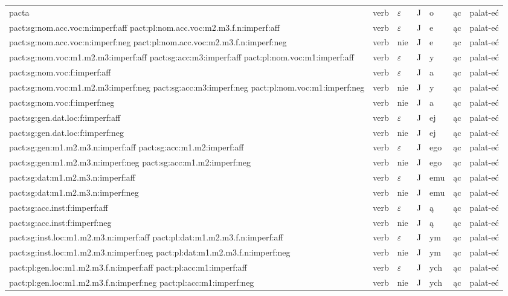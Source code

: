 \documentclass{article}
\begin{document}
\begin{longtable}{p{7cm}|l|l|l|l|l|l}
pacta & verb & $\varepsilon$ & J & o & ąc & palat-eć\\
pact:sg:nom.acc.voc:n:imperf:aff pact:pl:nom.acc.voc:m2.m3.f.n:imperf:aff & verb & $\varepsilon$ & J & e & ąc & palat-eć\\
pact:sg:nom.acc.voc:n:imperf:neg pact:pl:nom.acc.voc:m2.m3.f.n:imperf:neg & verb & nie & J & e & ąc & palat-eć\\
pact:sg:nom.voc:m1.m2.m3:imperf:aff pact:sg:acc:m3:imperf:aff pact:pl:nom.voc:m1:imperf:aff & verb & $\varepsilon$ & J & y & ąc & palat-eć\\
pact:sg:nom.voc:f:imperf:aff & verb & $\varepsilon$ & J & a & ąc & palat-eć\\
pact:sg:nom.voc:m1.m2.m3:imperf:neg pact:sg:acc:m3:imperf:neg pact:pl:nom.voc:m1:imperf:neg & verb & nie & J & y & ąc & palat-eć\\
pact:sg:nom.voc:f:imperf:neg & verb & nie & J & a & ąc & palat-eć\\
pact:sg:gen.dat.loc:f:imperf:aff & verb & $\varepsilon$ & J & ej & ąc & palat-eć\\
pact:sg:gen.dat.loc:f:imperf:neg & verb & nie & J & ej & ąc & palat-eć\\
pact:sg:gen:m1.m2.m3.n:imperf:aff pact:sg:acc:m1.m2:imperf:aff & verb & $\varepsilon$ & J & ego & ąc & palat-eć\\
pact:sg:gen:m1.m2.m3.n:imperf:neg pact:sg:acc:m1.m2:imperf:neg & verb & nie & J & ego & ąc & palat-eć\\
pact:sg:dat:m1.m2.m3.n:imperf:aff & verb & $\varepsilon$ & J & emu & ąc & palat-eć\\
pact:sg:dat:m1.m2.m3.n:imperf:neg & verb & nie & J & emu & ąc & palat-eć\\
pact:sg:acc.inst:f:imperf:aff & verb & $\varepsilon$ & J & ą & ąc & palat-eć\\
pact:sg:acc.inst:f:imperf:neg & verb & nie & J & ą & ąc & palat-eć\\
pact:sg:inst.loc:m1.m2.m3.n:imperf:aff pact:pl:dat:m1.m2.m3.f.n:imperf:aff & verb & $\varepsilon$ & J & ym & ąc & palat-eć\\
pact:sg:inst.loc:m1.m2.m3.n:imperf:neg pact:pl:dat:m1.m2.m3.f.n:imperf:neg & verb & nie & J & ym & ąc & palat-eć\\
pact:pl:gen.loc:m1.m2.m3.f.n:imperf:aff pact:pl:acc:m1:imperf:aff & verb & $\varepsilon$ & J & ych & ąc & palat-eć\\
pact:pl:gen.loc:m1.m2.m3.f.n:imperf:neg pact:pl:acc:m1:imperf:neg & verb & nie & J & ych & ąc & palat-eć\\

\end{longtable}
\end{document}
